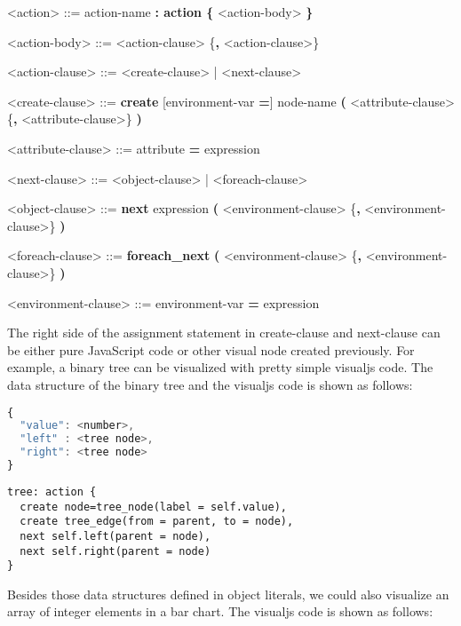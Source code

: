 \begin{center}
  \begin{minipage}{0.8\linewidth}
    \begin{grammar}
      <action> ::= action-name \textbf{: action \{} <action-body> \textbf{\}}

      <action-body> ::= <action-clause> \{\textbf{,} <action-clause>\}

      <action-clause> ::= <create-clause> | <next-clause>

      <create-clause> ::= \textbf{create} [environment-var \textbf{=}] node-name \textbf{(} <attribute-clause> \{\textbf{,} <attribute-clause>\} \textbf{)}

      <attribute-clause> ::= attribute \textbf{=} expression

      <next-clause> ::= <object-clause> | <foreach-clause>

      <object-clause> ::= \textbf{next} expression \textbf{(} <environment-clause> \{\textbf{,} <environment-clause>\} \textbf{)}

      <foreach-clause> ::= \textbf{foreach\_next} \textbf{(} <environment-clause> \{\textbf{,} <environment-clause>\} \textbf{)}

      <environment-clause> ::= environment-var \textbf{=} expression
    \end{grammar}
  \end{minipage}
\end{center}

The right side of the assignment statement in create-clause and next-clause can be either pure JavaScript code or other visual node created previously. For example, a binary tree can be visualized with pretty simple visualjs code. The data structure of the binary tree and the visualjs code is shown as follows:

\begin{lstlisting}[language=JavaScript]
{
  "value": <number>,
  "left" : <tree node>,
  "right": <tree node>
}
\end{lstlisting}

\begin{lstlisting}
tree: action {
  create node=tree_node(label = self.value),
  create tree_edge(from = parent, to = node),
  next self.left(parent = node),
  next self.right(parent = node)
}
\end{lstlisting}

Besides those data structures defined in object literals, we could also visualize an array of integer elements in a bar chart. The visualjs code is shown as follows:

